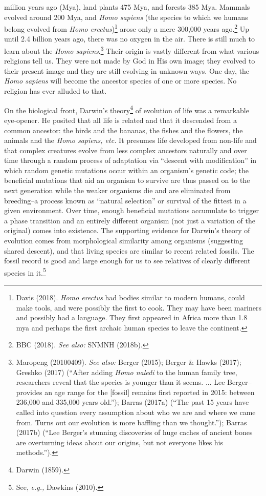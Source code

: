 \begin{multicols}{2}

\noindent
million years ago (Mya), land plants 475 Mya, and forests 385 Mya. Mammals evolved around 200 Mya, and \textit{Homo sapiens} (the species to which we humans belong evolved from \textit{Homo erectus})\footnote{Davis (2018). \textit{Homo erectus} had bodies similar to modern humans, could make tools, and were possibly the first to cook. They may have been mariners and possibly had a language. They first appeared in Africa more than 1.8 mya and perhaps the first archaic human species to leave the continent.} arose only a mere 300,000 years ago.\footnote{BBC (2018). \textit{See also:} SNMNH (2018b).} Up until 2.4 billion years ago, there was no oxygen in the air. There is still much to learn about the \textit{Homo sapiens}.\footnote{Maropeng (20100409). \textit{See also:} Berger (2015); Berger \& Hawks (2017); Greshko (2017) (“After adding \textit{Homo naledi} to the human family tree, researchers reveal that the species is younger than it seems. ... Lee Berger--provides an age range for the [fossil] remains first reported in 2015: between 236,000 and 335,000 years old.”); Barras (2017a) (“The past 15 years have called into question every assumption about who we are and where we came from. Turns out our evolution is more baffling than we thought.”); Barras (2017b) (“Lee Berger’s stunning discoveries of huge caches of ancient bones are overturning ideas about our origins, but not everyone likes his methods.”).} Their origin is vastly different from what various religions tell us. They were not made by God in His own image; they evolved to their present image and they are still evolving in unknown ways. One day, the \textit{Homo sapiens} will become the ancestor species of one or more species. No religion has ever alluded to that.

On the biological front, Darwin's theory\footnote{Darwin (1859).} of evolution of life was a remarkable eye-opener. He posited that all life is related and that it descended from a common ancestor: the birds and the bananas, the fishes and the flowers, the animals and the \textit{Homo sapiens, etc.} It presumes life developed from non-life and that complex creatures evolve from less complex ancestors naturally and over time through a random process of adaptation via “descent with modification” in which random genetic mutations occur within an organism's genetic code; the beneficial mutations that aid an organism to survive are  thus passed on to the next generation while the weaker organisms die and are eliminated from breeding--a process known as “natural selection” or survival of the fittest in a given environment. Over time, enough beneficial mutations accumulate to trigger a phase transition and an entirely different organism (not just a variation of the original) comes into existence. The supporting evidence for Darwin's theory of evolution comes from morphological similarity among organisms (suggesting shared descent), and that living species are similar to recent related fossils. The fossil record is good and large enough for us to see relatives of clearly different species in it.\footnote{See, \textit{e.g.,} Dawkins (2010).}


\end{multicols}
